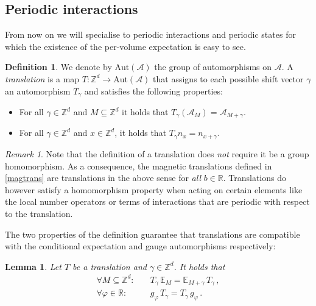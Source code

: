 \documentclass[a4paper]{article}
\newcommand{\E}{\mathbb{E}}
\newcommand{\g}{\gamma}
\newcommand{\Z}{\mathbb{Z}}
\newcommand{\mA}{\mathcal{A}}
\newcommand{\R}{\mathbb{R}}
\theoremstyle{plain}
\newtheorem{lemma}[theorem]{Lemma}
\theoremstyle{definition}
\newtheorem{definition}[theorem]{Definition}
\theoremstyle{remark}
\newtheorem{remark}[theorem]{Remark}
\renewcommand{\(}{\left(}
\renewcommand{\)}{\right)}
\begin{document}
\subsection{Periodic interactions}

From now on we will specialise to periodic interactions and periodic states for which the existence of the per-volume expectation is easy to see.  

\medskip

\begin{definition}\label{def:translation}
We denote by $\mathrm{Aut}(\mA)$ the group of automorphisms on $\mA$.
    A \emph{translation} is a map $T:\Z^d \to \mathrm{Aut}(\mA)$ that assigns to each possible shift vector $\g$ an automorphism $T_\g$ and satisfies the following properties:
    \begin{itemize}
        \item[(i)] For all $\g\in \Z^d$ and $M \subseteq \Z^d$ it holds that $T_{\g}(\mA_M) = \mA_{M+\g}$.
        \item[(ii)] For all $\g\in \Z^d$ and $x\in \Z^d$, it holds that $T_{\g}n_x = n_{x+\g}$.
    \end{itemize}
\end{definition}

\begin{remark}
    Note that the definition of a translation does \emph{not} require it be a group homomorphism.  As a consequence,
   the  magnetic translations defined in \eqref{magtrans} are translations in the above sense for \emph{all} $b\in\R$.
   Translations do however satisfy a homomorphism property when acting on certain elements like the local number operators or terms of interactions that are periodic with respect to the translation. 
\end{remark}

  The two properties of the definition guarantee that translations are compatible with the conditional expectation and gauge automorphisms respectively:

\medskip
\begin{lemma}\label{lem: compatibility of translations}
    Let $T$ be a translation and $\g \in \Z^d$. It holds that 
    \begin{align*}
        \forall M \subseteq \Z^d \colon& \quad T_\g \, \E_M   =  \E_{M + \g} \, T_\g \, ,\\
        \forall \varphi \in \R\colon& \quad g_\varphi \, T_\g = T_\g \, g_\varphi \, .
    \end{align*} 
\end{lemma}
\end{document}

